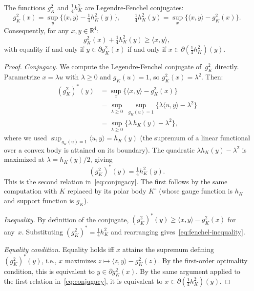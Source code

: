 \begin{lemma}\label{lem:fenchel-duality}
The functions $g_K^2$ and $\tfrac{1}{4}h_K^2$ are Legendre-Fenchel conjugates:
\begin{equation}\label{eq:conjugacy}
  g_K^2(x) = \sup_y \bigl\{\langle x, y \rangle - \tfrac{1}{4} h_K^2(y)\bigr\},
  \qquad
  \tfrac{1}{4}h_K^2(y) = \sup_x \bigl\{\langle x, y \rangle - g_K^2(x)\bigr\}.
\end{equation}
Consequently, for any $x, y \in \mathbb{R}^4$:
\begin{equation}\label{eq:fenchel-inequality}
  g_K^2(x) + \tfrac{1}{4} h_K^2(y) \geq \langle x, y \rangle,
\end{equation}
with equality if and only if
$y \in \partial g_K^2(x)$ if and only if
$x \in \partial(\tfrac{1}{4} h_K^2)(y)$.
\end{lemma}

\begin{proof}
\emph{Conjugacy.}
We compute the Legendre-Fenchel conjugate of~$g_K^2$ directly.
Parametrize $x = \lambda u$ with $\lambda \geq 0$ and $g_K(u) = 1$,
so $g_K^2(x) = \lambda^2$.
Then:
\begin{align*}
  (g_K^2)^*(y)
  &= \sup_x \bigl\{\langle x, y \rangle - g_K^2(x)\bigr\} \\
  &= \sup_{\lambda \geq 0}\;
    \sup_{g_K(u) = 1}
    \bigl\{\lambda \langle u, y \rangle - \lambda^2\bigr\} \\
  &= \sup_{\lambda \geq 0}
    \bigl\{\lambda\, h_K(y) - \lambda^2\bigr\},
\end{align*}
where we used $\sup_{g_K(u) = 1} \langle u, y \rangle = h_K(y)$
(the supremum of a linear functional over a convex body
is attained on its boundary).
The quadratic $\lambda h_K(y) - \lambda^2$ is maximized
at $\lambda = h_K(y)/2$, giving
\[
  (g_K^2)^*(y) = \tfrac{1}{4} h_K^2(y).
\]
This is the second relation in~\eqref{eq:conjugacy}.
The first follows by the same computation with $K$ replaced by its
polar body $K^\circ$ (whose gauge function is $h_K$ and
support function is $g_K$).

\emph{Inequality.}
By definition of the conjugate,
$(g_K^2)^*(y) \geq \langle x, y \rangle - g_K^2(x)$ for any~$x$.
Substituting $(g_K^2)^* = \tfrac{1}{4}h_K^2$ and rearranging
gives~\eqref{eq:fenchel-inequality}.

\emph{Equality condition.}
Equality holds iff $x$ attains the supremum defining $(g_K^2)^*(y)$,
i.e., $x$ maximizes $z \mapsto \langle z, y \rangle - g_K^2(z)$.
By the first-order optimality condition, this is equivalent to
$y \in \partial g_K^2(x)$.
By the same argument applied to the first relation in~\eqref{eq:conjugacy},
it is equivalent to $x \in \partial(\tfrac{1}{4}h_K^2)(y)$.
\end{proof}

